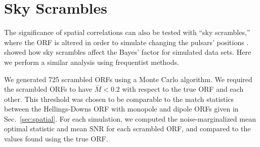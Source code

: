 \documentclass[twocolumn,aps,prd,superscriptaddress]{revtex4-1}
\begin{document}
\section{Sky Scrambles}
\label{sec:skyscrambles}

The significance of spatial correlations can also be tested with ``sky scrambles,'' 
where the ORF is altered in order to simulate changing the pulsars' positions \citep{cs2016}. 
\citet{tlb+2017} showed how sky scrambles affect the Bayes' factor for simulated data sets. 
Here we perform a similar analysis using frequentist methods.

We generated 725 scrambled ORFs 
using a Monte Carlo algorithm. 
We required the scrambled ORFs to have $\bar{M} < 0.2$ 
with respect to the true ORF and each other. 
This threshold was chosen to be comparable to the match statistics 
between the Hellings-Downs ORF with monopole and dipole ORFs 
given in Sec.~\ref{sec:spatial}.
For each simulation, 
we computed the noise-marginalized mean optimal statistic and mean SNR 
for each scrambled ORF, and compared to the values found using the true ORF.
\end{document}

